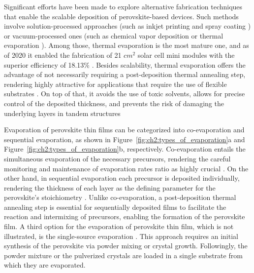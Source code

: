 Significant efforts have been made to explore alternative fabrication techniques that enable the scalable deposition of perovskite-based devices. Such methods involve solution-processed approaches (such as inkjet printing \cite{Zhang2023ProgressApplications} and spray coating \cite{Bishop2020DevelopmentCells}) or vacuum-processed ones (such as chemical vapor deposition \cite{Magubane2023SequentialTransport} or thermal evaporation \cite{Wang2024ThermallyBeyond}). Among those, thermal evaporation is the most mature one, and as of 2020 it enabled the fabrication of 21 $cm^2$ solar cell mini modules with the superior efficiency of 18.13\% \cite{Vaynzof2020TheProcessing, Li2020HighlyMini-modules}. Besides scalability, thermal evaporation offers the advantage of not necessarily requiring a post-deposition thermal annealing step, rendering highly attractive for applications that require the use of flexible substrates \cite{Becker2019LowExperimentation}. On top of that, it avoids the use of toxic solvents, allows for precise control of the deposited thickness, and prevents the risk of damaging the underlying layers in tandem structures \cite{Zhang2020TowardCells, Forgacs2017EfficientCells}

Evaporation of perovskite thin films can be categorized into co-evaporation and sequential evaporation, as shown in Figure~\ref{fig:ch2:types_of_evaporation}a and Figure~\ref{fig:ch2:types_of_evaporation}b, respectively. Co-evaporation entails the simultaneous evaporation of the necessary precursors, rendering the careful monitoring and maintenance of evaporation rates ratio as highly crucial \cite{Frolova2017HighlyPbI2,Abzieher2021FromCells}. On the other hand, in sequential evaporation each precursor is deposited individually, rendering the thickness of each layer as the defining parameter for the perovskite's stoichiometry \cite{Liu2019SequentiallyCells, Burschka2013SequentialCells, Li2022SequentialEfficiency}. Unlike co-evaporation, a post-deposition thermal annealing step is essential for sequentially deposited films to facilitate the reaction and intermixing of precursors, enabling the formation of the perovskite film. A third option for the evaporation of perovskite thin film, which is not illustrated, is the single-source evaporation \cite{Zheng2019SingleApplications, Soto-Montero2024Single-SourceCells, Li2020FabricationEvaporation}. This approach requires an initial synthesis of the perovskite via powder mixing or crystal growth. Followingly, the powder mixture or the pulverized crystals are loaded in a single substrate from which they are evaporated. 


